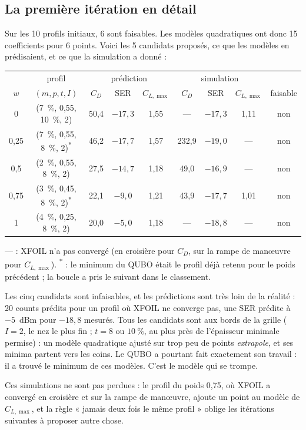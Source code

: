 \subsection{La première itération en détail}
Sur les 10 profils initiaux, 6 sont faisables. Les modèles quadratiques ont donc 15 coefficients pour 6 points. Voici les 5 candidats proposés, ce que les modèles en prédisaient, et ce que la simulation a donné :
\begin{center}
\renewcommand{\arraystretch}{1.2}
\small
\begin{tabular}{c c ccc ccc c}
\toprule
& profil & \multicolumn{3}{c}{prédiction} & \multicolumn{3}{c}{simulation} & \\
$w$ & $(m,p,t,I)$ & $C_D$ & SER & $C_{L,\max}$ & $C_D$ & SER & $C_{L,\max}$ & faisable \\
\midrule
0 & (7~\%, 0,55, 10~\%, 2) & 50,4 & $-17{,}3$ & 1,55 & --- & $-17{,}3$ & 1,11 & non \\
0,25 & (7~\%, 0,55, 8~\%, 2)\textsuperscript{*} & 46,2 & $-17{,}7$ & 1,57 & 232,9 & $-19{,}0$ & --- & non \\
0,5 & (2~\%, 0,55, 8~\%, 2) & 27,5 & $-14{,}7$ & 1,18 & 49,0 & $-16{,}9$ & --- & non \\
0,75 & (3~\%, 0,45, 8~\%, 2)\textsuperscript{*} & 22,1 & $-9{,}0$ & 1,21 & 43,9 & $-17{,}7$ & 1,01 & non \\
1 & (4~\%, 0,25, 8~\%, 2) & 20,0 & $-5{,}0$ & 1,18 & --- & $-18{,}8$ & --- & non \\
\bottomrule
\end{tabular}
\end{center}
{\small --- : XFOIL n'a pas convergé (en croisière pour $C_D$, sur la rampe de manœuvre pour $C_{L,\max}$). \textsuperscript{*} : le minimum du QUBO était le profil déjà retenu pour le poids précédent ; la boucle a pris le suivant dans le classement.}

\medskip
Les cinq candidats sont infaisables, et les prédictions sont très loin de la réalité : 20 counts prédits pour un profil où XFOIL ne converge pas, une SER prédite à $-5$~dBm pour $-18{,}8$ mesurés. Tous les candidats sont aux bords de la grille ($I=2$, le nez le plus fin ; $t=8$ ou $10~\%$, au plus près de l'épaisseur minimale permise) : un modèle quadratique ajusté sur trop peu de points \emph{extrapole}, et ses minima partent vers les coins. Le QUBO a pourtant fait exactement son travail : il a trouvé le minimum de ces modèles. C'est le modèle qui se trompe.

Ces simulations ne sont pas perdues : le profil du poids 0,75, où XFOIL a convergé en croisière et sur la rampe de manœuvre, ajoute un point au modèle de $C_{L,\max}$, et la règle « jamais deux fois le même profil » oblige les itérations suivantes à proposer autre chose.

